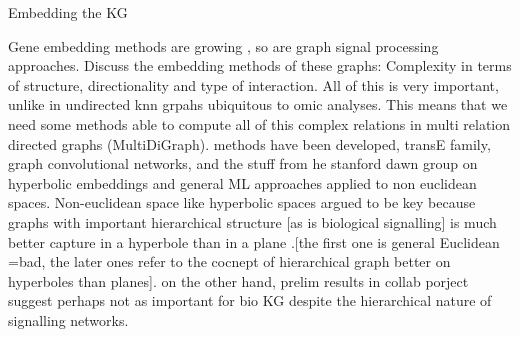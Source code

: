 Embedding the KG

Gene embedding methods are growing , so are graph signal processing approaches. 
Discuss the embedding methods of these graphs:
Complexity in terms of structure, directionality and type of interaction. All of this is very important, unlike in undirected knn grpahs ubiquitous to omic analyses.
This means that we need some methods able to compute all of this complex relations in multi relation directed graphs  (MultiDiGraph). methods have been developed, transE \cite{bordes_translating_2013}family, graph convolutional networks, and the stuff from he stanford dawn group on  hyperbolic embeddings  \cite{chami_hyperbolic_2019} and general ML approaches applied to non euclidean spaces.
Non-euclidean space like hyperbolic spaces argued to be key because graphs with important hierarchical structure [as is biological signalling] is much better capture in a hyperbole than in a plane \cite{bronstein_geometric_2017,nickel_poincare_2017,chamberlain_neural_2017}.[the first one is general Euclidean =bad, the later ones refer to the cocnept of hierarchical graph better on hyperboles than planes].
on the other hand, prelim results in collab porject suggest perhaps not as important for bio KG despite the hierarchical nature of signalling networks.


% 


